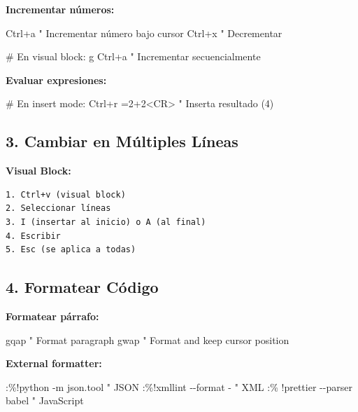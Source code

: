 \documentclass[
  doc,
  floatsintext,
  longtable,
  a4paper,
  nolmodern,
  notxfonts,
  notimes,
  12pt,
  colorlinks=true,linkcolor=blue,citecolor=blue,urlcolor=blue]{apa7}
\newenvironment{Shaded}{\begin{snugshade}}{\end{snugshade}}
\newcommand{\NormalTok}[1]{\textcolor[rgb]{0.00,0.23,0.31}{#1}}
\begin{document}
\textbf{Incrementar números:}

\begin{Shaded}
\begin{Highlighting}[]
\NormalTok{Ctrl+a      " Incrementar número bajo cursor}
\NormalTok{Ctrl+x      " Decrementar}

\NormalTok{\# En visual block:}
\NormalTok{g Ctrl+a    " Incrementar secuencialmente}
\end{Highlighting}
\end{Shaded}

\textbf{Evaluar expresiones:}

\begin{Shaded}
\begin{Highlighting}[]
\NormalTok{\# En insert mode:}
\NormalTok{Ctrl+r =2+2\textless{}CR\textgreater{}  " Inserta resultado (4)}
\end{Highlighting}
\end{Shaded}

\subsection{3. Cambiar en Múltiples
Líneas}\label{cambiar-en-muxfaltiples-luxedneas}

\textbf{Visual Block:}

\begin{verbatim}
1. Ctrl+v (visual block)
2. Seleccionar líneas
3. I (insertar al inicio) o A (al final)
4. Escribir
5. Esc (se aplica a todas)
\end{verbatim}

\subsection{4. Formatear Código}\label{formatear-cuxf3digo}

\textbf{Formatear párrafo:}

\begin{Shaded}
\begin{Highlighting}[]
\NormalTok{gqap        " Format paragraph}
\NormalTok{gwap        " Format and keep cursor position}
\end{Highlighting}
\end{Shaded}

\textbf{External formatter:}

\begin{Shaded}
\begin{Highlighting}[]
\NormalTok{:\%!python {-}m json.tool     " JSON}
\NormalTok{:\%!xmllint {-}{-}format {-}      " XML}
\NormalTok{:\% !prettier {-}{-}parser babel  " JavaScript}
\end{Highlighting}
\end{Shaded}
\end{document}
